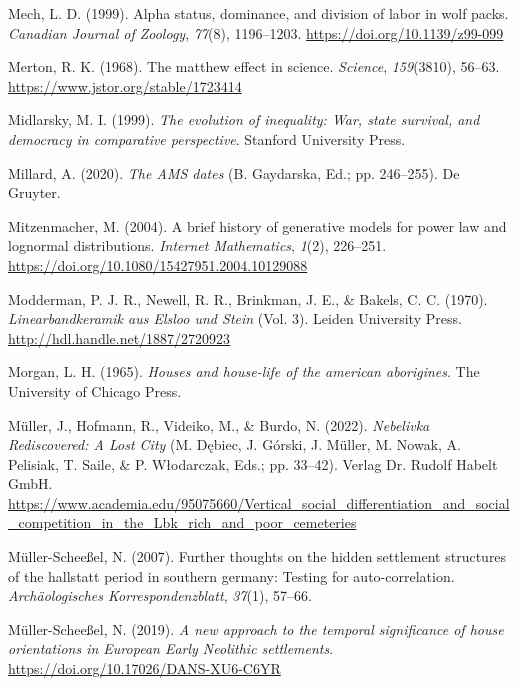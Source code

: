 \documentclass[
  12pt,
]{book}
\newlength{\cslhangindent}
\newlength{\cslentryspacingunit} %
\newenvironment{CSLReferences}[2] %
 {%
  \setlength{\parindent}{0pt}
  \ifodd #1
  \let\oldpar\par
  \def\par{\hangindent=\cslhangindent\oldpar}
  \fi
  \setlength{\parskip}{#2\cslentryspacingunit}
 }%
 {}
\begin{document}
\begin{CSLReferences}{1}{0}
\leavevmode{}%
Mech, L. D. (1999). Alpha status, dominance, and division of labor in wolf packs. \emph{Canadian Journal of Zoology}, \emph{77}(8), 1196--1203. \url{https://doi.org/10.1139/z99-099}

\leavevmode{}%
Merton, R. K. (1968). The matthew effect in science. \emph{Science}, \emph{159}(3810), 56--63. \url{https://www.jstor.org/stable/1723414}

\leavevmode{}%
Midlarsky, M. I. (1999). \emph{The evolution of inequality: War, state survival, and democracy in comparative perspective}. Stanford University Press.

\leavevmode{}%
Millard, A. (2020). \emph{The AMS dates} (B. Gaydarska, Ed.; pp. 246--255). De Gruyter.

\leavevmode{}%
Mitzenmacher, M. (2004). A brief history of generative models for power law and lognormal distributions. \emph{Internet Mathematics}, \emph{1}(2), 226--251. \url{https://doi.org/10.1080/15427951.2004.10129088}

\leavevmode{}%
Modderman, P. J. R., Newell, R. R., Brinkman, J. E., \& Bakels, C. C. (1970). \emph{Linearbandkeramik aus Elsloo und Stein} (Vol. 3). Leiden University Press. \url{http://hdl.handle.net/1887/2720923}

\leavevmode{}%
Morgan, L. H. (1965). \emph{Houses and house-life of the american aborigines}. The University of Chicago Press.

\leavevmode{}%
Müller, J., Hofmann, R., Videiko, M., \& Burdo, N. (2022). \emph{Nebelivka {\textendash} Rediscovered: A Lost City} (M. Dębiec, J. Górski, J. Müller, M. Nowak, A. Pelisiak, T. Saile, \& P. Włodarczak, Eds.; pp. 33--42). Verlag Dr. Rudolf Habelt GmbH. \url{https://www.academia.edu/95075660/Vertical_social_differentiation_and_social_competition_in_the_Lbk_rich_and_poor_cemeteries}

\leavevmode{}%
Müller-Scheeßel, N. (2007). Further thoughts on the hidden settlement structures of the hallstatt period in southern germany: Testing for auto-correlation. \emph{Archäologisches Korrespondenzblatt}, \emph{37}(1), 57--66.

\leavevmode{}%
Müller-Scheeßel, N. (2019). \emph{A new approach to the temporal significance of house orientations in European Early Neolithic settlements}. \url{https://doi.org/10.17026/DANS-XU6-C6YR}


\end{CSLReferences}
\end{document}
